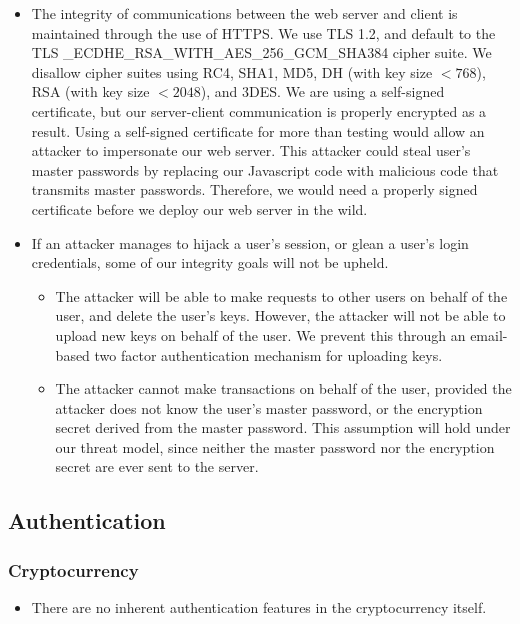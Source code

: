 \documentclass[12pt]{article}
\begin{document}
\begin{itemize}
	\item The integrity of communications between the web server and client is maintained through the use of HTTPS.
	We use TLS 1.2, and default to the TLS \_ECDHE\_RSA\_WITH\_AES\_256\_GCM\_SHA384 cipher suite.
	We disallow cipher suites using RC4, SHA1, MD5, DH (with key size $< 768$), RSA (with key size $< 2048$), and 3DES.
	We are using a self-signed certificate, but our server-client communication is properly encrypted as a result.
	Using a self-signed certificate for more than testing would allow an attacker to impersonate our web server. This attacker could steal user's master passwords by replacing our Javascript code with malicious code that transmits master passwords.
	Therefore, we would need a properly signed certificate before we deploy our web server in the wild.

	\item If an attacker manages to hijack a user's session, or glean a user's login credentials, some of our integrity goals will not be upheld.
	\begin{itemize}
		\item The attacker will be able to make requests to other users on behalf of the user, and delete the user's keys.
		However, the attacker will not be able to upload new keys on behalf of the user.
		We prevent this through an email-based two factor authentication mechanism for uploading keys.
		\item The attacker cannot make transactions on behalf of the user, provided the attacker does not know the user's master password, or the encryption secret derived from the master password.
		This assumption will hold under our threat model, since neither the master password nor the encryption secret are ever sent to the server.
	\end{itemize}
\end{itemize}

\subsection{Authentication}

\subsubsection*{Cryptocurrency}

\begin{itemize}
	\item There are no inherent authentication features in the cryptocurrency itself.
\end{itemize}
\end{document}
